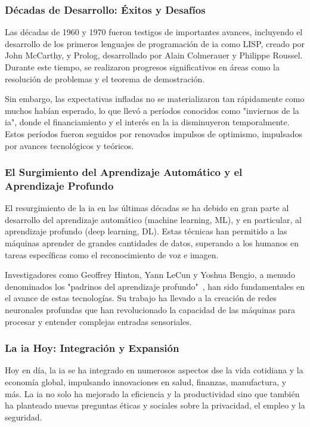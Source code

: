 \subsubsection{Décadas de Desarrollo: Éxitos y Desafíos}

Las décadas de 1960 y 1970 fueron testigos de importantes avances, incluyendo el desarrollo de los primeros lenguajes de programación de \acrshort{ia} como LISP, creado por John McCarthy, y Prolog, desarrollado por Alain Colmerauer y Philippe Roussel. Durante este tiempo, se realizaron progresos significativos en áreas como la resolución de problemas y el teorema de demostración.

Sin embargo, las expectativas infladas no se materializaron tan rápidamente como muchos habían esperado, lo que llevó a períodos conocidos como "inviernos de la \acrshort{ia}", donde el financiamiento y el interés en la \acrshort{ia} disminuyeron temporalmente. Estos períodos fueron seguidos por renovados impulsos de optimismo, impulsados por avances tecnológicos y teóricos.

\subsubsection{El Surgimiento del Aprendizaje Automático y el Aprendizaje Profundo}

El resurgimiento de la \acrshort{ia} en las últimas décadas se ha debido en gran parte al desarrollo del aprendizaje automático (machine learning, ML), y en particular, al aprendizaje profundo (deep learning, DL). Estas técnicas han permitido a las máquinas aprender de grandes cantidades de datos, superando a los humanos en tareas específicas como el reconocimiento de voz e imagen.

Investigadores como Geoffrey Hinton, Yann LeCun y Yoshua Bengio, a menudo denominados los "padrinos del aprendizaje profundo"~\cite{goodfellow2016deep}, han sido fundamentales en el avance de estas tecnologías. Su trabajo ha llevado a la creación de redes neuronales profundas que han revolucionado la capacidad de las máquinas para procesar y entender complejas entradas sensoriales.

\subsubsection{La \acrshort{ia} Hoy: Integración y Expansión}

Hoy en día, la \acrshort{ia} se ha integrado en numerosos aspectos dse la vida cotidiana y la economía global, impulsando innovaciones en salud, finanzas, manufactura, y más. La \acrshort{ia} no solo ha mejorado la eficiencia y la productividad sino que también ha planteado nuevas preguntas éticas y sociales sobre la privacidad, el empleo y la seguridad.

